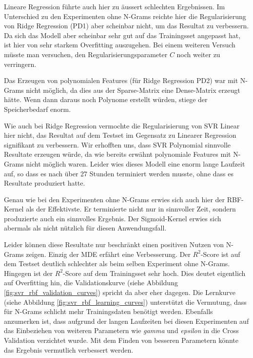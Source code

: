 \documentclass[10pt, a4paper]{article}
\begin{document}
Lineare Regression führte auch hier zu äussert schlechten Ergebnissen. Im Unterschied zu den Experimenten ohne N-Grams reichte hier die Regularisierung von Ridge Regression (PD1) aber scheinbar nicht, um das Resultat zu verbessern. Da sich das Modell aber scheinbar sehr gut auf das Trainingsset angepasst hat, ist hier von sehr starkem Overfitting auszugehen. Bei einem weiteren Versuch müsste man versuchen, den Regularisierungsparameter \(C\) noch weiter zu verringern.

Das Erzeugen von polynomialen Features (für Ridge Regression PD2) war mit N-Grams nicht möglich, da dies aus der Sparse-Matrix eine Dense-Matrix erzeugt hätte. Wenn dann daraus noch Polynome erstellt würden, stiege der Speicherbedarf enorm.

Wie auch bei Ridge Regression vermochte die Regularisierung von SVR Linear hier nicht, das Resultat auf dem Testset im Gegensatz zu Linearer Regression signifikant zu verbessern. Wir erhofften uns, dass SVR Polynomial sinnvolle Resultate erzeugen würde, da wie bereits erwähnt polynomiale Features mit N-Grams nicht möglich waren. Leider wies dieses Modell eine enorm lange Laufzeit auf, so dass es nach über 27 Stunden terminiert werden musste, ohne dass es Resultate produziert hatte.

Genau wie bei den Experimenten ohne N-Grams erwies sich auch hier der \ac{RBF}-Kernel als der Effektivste. Er terminierte nicht nur in sinnvoller Zeit, sondern produzierte auch ein sinnvolles Ergebnis. Der Sigmoid-Kernel erwies sich abermals als nicht nützlich für diesen Anwendungsfall.

Leider können diese Resultate nur beschränkt einen positiven Nutzen von N-Grams zeigen. Einzig der \ac{MDE} erfährt eine Verbesserung. Der \(R^2\)-Score ist auf dem Testset deutlich schlechter als beim selben Experiment ohne N-Grams. Hingegen ist der \(R^2\)-Score auf dem Trainingsset sehr hoch. Dies deutet eigentlich auf Overfitting hin, die Validationskurve (siehe Abbildung \ref{fig:svr_rbf_validation_curves}) spricht da aber eher dagegen. Die Lernkurve (siehe Abbildung \ref{fig:svr_rbf_learning_curves}) unterstützt die Vermutung, dass für N-Grams schlicht mehr Trainingsdaten benötigt werden. Ebenfalls anzumerken ist, dass aufgrund der langen Laufzeiten bei diesen Experimenten auf das Einbeziehen von weiteren Parametern wie \emph{gamma} und \emph{epsilon} in die Cross Validation verzichtet wurde. Mit dem Finden von besseren Parametern könnte das Ergebnis vermutlich verbessert werden.
\end{document}

